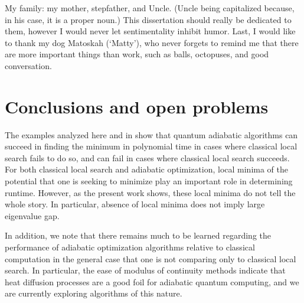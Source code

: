 \documentclass[letterpaper,12pt]{umd-thesis}
\numberwithin{equation}{chapter}
\numberwithin{thm}{chapter}
\numberwithin{lem}{chapter}
\numberwithin{cor}{chapter}
\numberwithin{definition}{chapter}
\begin{document}
\begin{preliminary}
\begin{acknowledgements}
		My family: my mother, stepfather, and Uncle. (Uncle being capitalized because, in his case, it is a proper noun.) This dissertation should really be dedicated to them, however I would never let sentimentality inhibit humor. Last, I would like to thank my dog Matoskah (`Matty'), who never forgets to remind me that there are more important things than work, such as balls, octopuses, and good conversation. 
	\end{acknowledgements}
\end{preliminary}











\chapter{Conclusions and open problems}
The examples analyzed here and in \cite{R04, DMV01, FGG02, VDV03,
  aminchoi} show that quantum adiabatic algorithms can succeed in
finding the minimum in polynomial time in cases where classical local
search fails to do so, and can fail in cases where classical local
search succeeds. For both classical local search and adiabatic
optimization, local minima of the potential that one is seeking to
minimize play an important role in determining runtime. However, as
the present work shows, these local minima do not tell the whole
story. In particular, absence of local minima does not imply large
eigenvalue gap.

In addition, we note that there remains much to be learned regarding
the performance of adiabatic optimization algorithms relative to
classical computation in the general case that one is not comparing
only to classical local search. In particular, the ease of modulus of continuity methods indicate that heat diffusion processes are a good foil for adiabatic quantum computing, and we are currently exploring algorithms of this nature.
\end{document}
